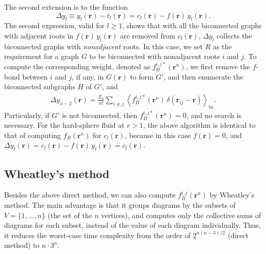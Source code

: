 \documentclass[aip,jcp,preprint,superscriptaddress,showpacs,preprintnumbers,amsmath,amssymb]{revtex4-1}
\numberwithin{equation}{section}
\newcommand{\vct}[1]{\mathbf{#1}}
\providecommand{\vr}{} %
\renewcommand{\vr}{\vct{r}}
\begin{document}
The second extension is to the function
\[
\Delta y_l
\equiv
y_l(\vr) - t_l(\vr)
= c_l(\vr) - f(\vr) \, y_l(\vr).
\]
The second expression, valid for $l \ge 1$,
shows that with all the biconnected graphs
with adjacent roots in $f(\vr) \, y_l(\vr)$
are removed from $c_l(\vr)$,
$\Delta y_l$ collects the biconnected graphs
with \emph{nonadjacent} roots.
%
In this case,
we set $R$ as the requirement for a graph $G$
to be biconnected with nonadjacent roots $i$ and $j$.
%
To compute the corresponding weight,
denoted as $f_B^{i,j*}(\vr^n)$,
we first remove the $f$-bond between $i$ and $j$,
if any, in $G(\vr)$ to form $G'$,
and then enumerate the biconnected subgraphs $H$ of $G'$,
and
%
%
%
\begin{align*}
\Delta y_{n-2}(\vr)
=
\frac{Z_n}{n!}
\sum_{i \ne j}
  \left\langle
    f_B^{i, j*}(\vr^n) \, \delta(\vr_{ij} - \vr)
  \right\rangle_\mathrm{bc}.
\end{align*}
%
%
%
Particularly,
if $G'$ is not biconnected,
then $f_B^{i,j*}(\vr^n) = 0$,
and no search is necessary.
%
For the hard-sphere fluid at $r > 1$,
the above algorithm is identical to that of
computing $f_B(\vr^n)$ for $c_l(\vr)$,
because in this case
$f(\vr) = 0$,
and
$\Delta y_l(\vr) = c_l(\vr) - f(\vr) \, y_l(\vr) = c_l(\vr)$.





\subsection{Wheatley's method}





Besides the above direct method,
we can also compute $f_B^{i,j}(\vr^n)$
by Wheatley's method\cite{wheatley2013}.
%
The main advantage is that
it groups diagrams
by the subsets of $V = \{1, \dots, n\}$
(the set of the $n$ vertices),
and computes only the collective sums of diagrams
for each subset,
instead of the value of each diagram individually.
%
Thus, it reduces the worst-case time complexity
from the order of $2^{n(n-3)/2}$ (direct method)
to $n\cdot3^n$.
\end{document}
